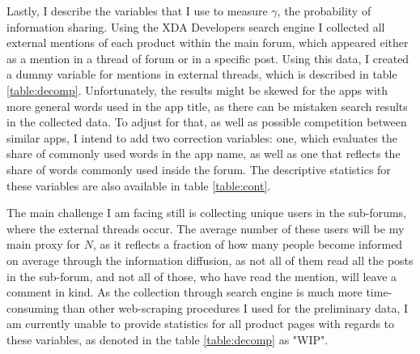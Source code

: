 \documentclass[13pt]{article}
\numberwithin{figure}{section}
\numberwithin{table}{section}
\theoremstyle{indented}
\numberwithin{equation}{section} %
\begin{document}
Lastly, I describe the variables that I use to measure $\gamma$, the probability of information sharing. Using the XDA Developers search engine I collected all external mentions of each product within the main forum, which appeared either as a mention in a thread of forum or in a specific post. Using this data, I created a dummy variable for mentions in external threads, which is described in table \ref{table:decomp}. Unfortunately, the results might be skewed for the apps with more general words used in the app title, as there can be mistaken search results in the collected data. To adjust for that, as well as possible competition between similar apps, I intend to add two correction variables: one, which evaluates the share of commonly used words in the app name, as well as one that reflects the share of words commonly used inside the forum. The descriptive statistics for these variables are also available in table \ref{table:cont}.

The main challenge I am facing still is collecting unique users in the sub-forums, where the external threads occur. The average number of these users will be my main proxy for $N$, as it reflects a fraction of how many people become informed on average through the information diffusion, as not all of them read all the posts in the sub-forum, and not all of those, who have read the mention, will leave a comment in kind. As the collection through search engine is much more time-consuming than other web-scraping procedures I used for the preliminary data, I am currently unable to provide statistics for all product pages with regards to these variables, as denoted in the table \ref{table:decomp} as "WIP".
\end{document}
